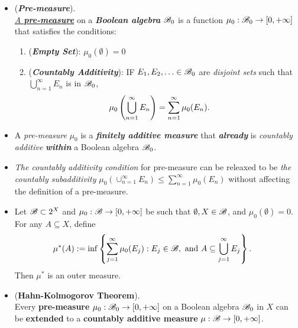 \documentclass[11pt]{article}
\begin{document}
\begin{itemize}
\item \begin{definition}  (\emph{\textbf{Pre-measure}}). \\
\underline{\emph{A \textbf{pre-measure}}} on a \emph{\textbf{Boolean algebra}} ${\mathscr B}_{0}$  is a function $\mu_0 : {\mathscr B}_0 \rightarrow [0, +\infty]$ that satisfies the conditions:
\begin{enumerate}
\item (\textbf{\emph{Empty Set}}): $\mu_0(\emptyset) = 0$
\item (\textbf{\emph{Countably Additivity}}): IF $E_1, E_2, \ldots \in {\mathscr B}_0$ are \emph{disjoint sets} such that $\bigcup_{n=1}^{\infty} E_n$ is in ${\mathscr B}_0$,
 \begin{align*}
\mu_0\left(\bigcup_{n=1}^{\infty} E_n\right) &= \sum_{n=1}^{\infty} \mu_0(E_n).
\end{align*} 
\end{enumerate} 
\end{definition}

\item \begin{remark}
A \emph{pre-measure} $\mu_0$ is a \emph{\textbf{finitely additive measure}} that \emph{\textbf{already}} is \emph{countably additive} \emph{\textbf{within}} a Boolean algebra ${\mathscr B}_0$. 
\end{remark}

\item \begin{remark}
\emph{The countably additivity condition} for pre-measure can be releaxed to be \emph{the countably subadditivity} $\mu_0(\cup_{n=1}^{\infty} E_n) \le \sum_{n=1}^{\infty} \mu_0(E_n)$ without affecting the definition of a pre-measure.
\end{remark}

\item \begin{proposition} \label{prop: outer_measure_premeasure}
Let ${\mathscr B} \subset 2^X$ and $\mu_0: {\mathscr B} \rightarrow [0, +\infty]$ be such that $\emptyset, X \in {\mathscr B}$, and $\mu_0(\emptyset) = 0$. For any $A \subseteq X$, define 
\begin{align*}
\mu^{*}(A) &:= \inf\left\{\sum_{j=1}^{\infty}\mu_0(E_j): E_j \in {\mathscr B}, \text{ and } A \subseteq \bigcup_{j=1}^{\infty}E_j\right\}. 
\end{align*} Then $\mu^{*}$ is an outer measure. 
\end{proposition}

\item \begin{theorem} (\textbf{Hahn-Kolmogorov Theorem}).\\
Every \textbf{pre-measure} $\mu_0 : {\mathscr B}_0 \rightarrow [0, +\infty]$  on a Boolean algebra ${\mathscr B}_{0}$ in $X$ can be \textbf{extended} to a \textbf{countably additive measure} $\mu : {\mathscr B} \rightarrow [0, +\infty]$.
\end{theorem}


\end{itemize}
\end{document}
